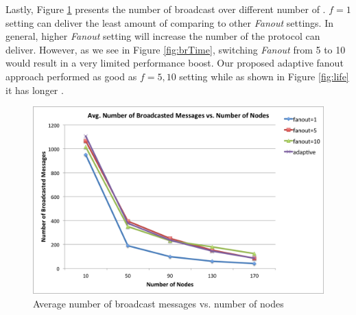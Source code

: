 Lastly, Figure \ref{fig:brNum} presents the number of \msgs broadcast over different number of \gns. $f=1$ setting can deliver the least amount of \msgs comparing to other \emph{Fanout} settings. In general, higher \emph{Fanout} setting will increase the number of \msgs the protocol can deliver. However, as we see in Figure \ref{fig:brTime}, switching \emph{Fanout} from 5 to 10 would result in a very limited performance boost. Our proposed adaptive fanout approach performed as good as $f=5,10$ setting while as shown in Figure \ref{fig:life} it has longer \emph{\anl}.

\begin{figure} 
	\centering
	\includegraphics[width=5.5in]{brNum.png}
	\caption{Average number of broadcast messages vs. number of nodes}
	\label{fig:brNum}
\end{figure}
